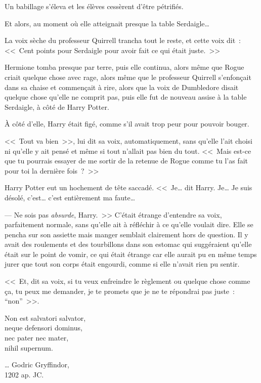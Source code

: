 Un babillage s'éleva et les élèves cessèrent d'être pétrifiés.

Et alors, au moment où elle atteignait presque la table Serdaigle…

La voix sèche du professeur Quirrell trancha tout le reste, et cette voix dit~: <<~Cent points pour Serdaigle pour avoir fait ce qui était juste.~>>

Hermione tomba presque par terre, puis elle continua, alors même que Rogue criait quelque chose avec rage, alors même que le professeur Quirrell s'enfonçait dans sa chaise et commençait à rire, alors que la voix de Dumbledore disait quelque chose qu'elle ne comprit pas, puis elle fut de nouveau assise à la table Serdaigle, à côté de Harry Potter.

À côté d'elle, Harry était figé, comme s'il avait trop peur pour pouvoir bouger.

<<~Tout va bien~>>, lui dit sa voix, automatiquement, sans qu'elle l'ait choisi ni qu'elle y ait pensé et même si tout n'allait pas bien du tout. <<~Mais est-ce que tu pourrais essayer de me sortir de la retenue de Rogue comme tu l'as fait pour toi la dernière fois~?~>>

Harry Potter eut un hochement de tête saccadé. <<~Je… dit Harry. Je… Je suis désolé, c'est… c'est entièrement ma faute…

--- Ne sois pas \emph{absurde}, Harry.~>> C'était étrange d'entendre sa voix, parfaitement normale, sans qu'elle ait à réfléchir à ce qu'elle voulait dire. Elle se pencha sur son assiette mais manger semblait clairement hors de question. Il y avait des roulements et des tourbillons dans son estomac qui suggéraient qu'elle était sur le point de vomir, ce qui était étrange car elle aurait pu en même temps jurer que tout son corps était engourdi, comme si elle n'avait rien pu sentir.

<<~Et, dit sa voix, si tu veux enfreindre le règlement ou quelque chose comme ça, tu peux me demander, je te promets que je ne te répondrai pas juste~: “non”~>>.
\later

\begin{center}
Non est salvatori salvator,\\
neque defensori dominus,\\
nec pater nec mater,\\
nihil supernum.

… Godric Gryffindor,\\
1202 ap. JC.
\end{center}


